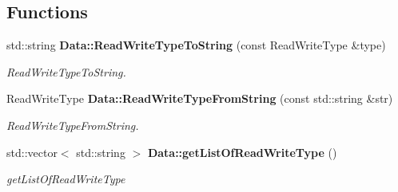 \subsection*{Functions}
\begin{DoxyCompactItemize}
\item 
std\+::string \textbf{ Data\+::\+Read\+Write\+Type\+To\+String} (const Read\+Write\+Type \&type)
\begin{DoxyCompactList}\small\item\em Read\+Write\+Type\+To\+String. \end{DoxyCompactList}\item 
Read\+Write\+Type \textbf{ Data\+::\+Read\+Write\+Type\+From\+String} (const std\+::string \&str)
\begin{DoxyCompactList}\small\item\em Read\+Write\+Type\+From\+String. \end{DoxyCompactList}\item 
std\+::vector$<$ std\+::string $>$ \textbf{ Data\+::get\+List\+Of\+Read\+Write\+Type} ()
\begin{DoxyCompactList}\small\item\em get\+List\+Of\+Read\+Write\+Type \end{DoxyCompactList}\end{DoxyCompactItemize}
